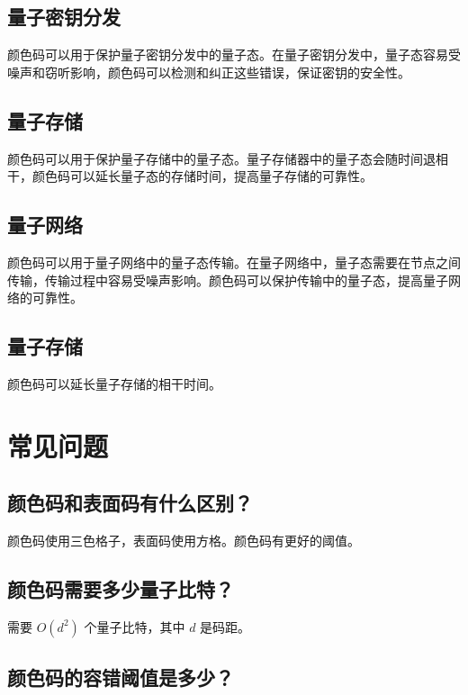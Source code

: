 \documentclass[12pt,a4paper]{article}
\begin{document}
\subsection{量子密钥分发}

颜色码可以用于保护量子密钥分发中的量子态。在量子密钥分发中，量子态容易受噪声和窃听影响，颜色码可以检测和纠正这些错误，保证密钥的安全性。

\subsection{量子存储}

颜色码可以用于保护量子存储中的量子态。量子存储器中的量子态会随时间退相干，颜色码可以延长量子态的存储时间，提高量子存储的可靠性。

\subsection{量子网络}

颜色码可以用于量子网络中的量子态传输。在量子网络中，量子态需要在节点之间传输，传输过程中容易受噪声影响。颜色码可以保护传输中的量子态，提高量子网络的可靠性。

\subsection{量子存储}

颜色码可以延长量子存储的相干时间。

\section{常见问题}

\subsection{颜色码和表面码有什么区别？}

颜色码使用三色格子，表面码使用方格。颜色码有更好的阈值。

\subsection{颜色码需要多少量子比特？}

需要 $O(d^2)$ 个量子比特，其中 $d$ 是码距。

\subsection{颜色码的容错阈值是多少？}
\end{document}
